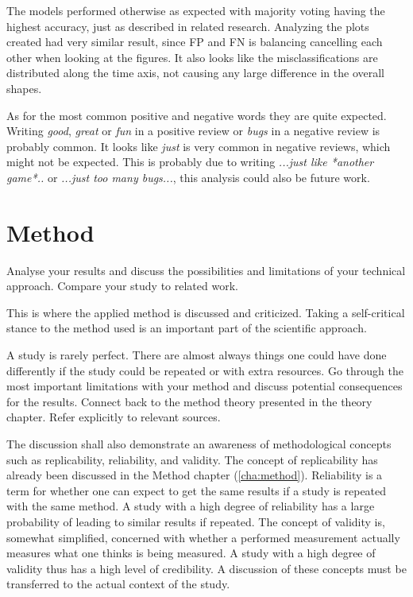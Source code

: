 The models performed otherwise as expected with majority voting having the highest accuracy, just as described in related research. 
Analyzing the plots created had very similar result, since FP and FN is balancing cancelling each other when looking at the figures. 
It also looks like the misclassifications are distributed along the time axis, not causing any large difference in the overall shapes. 


As for the most common positive and negative words they are quite expected. 
Writing \emph{good}, \emph{great} or \emph{fun} in a positive review or \emph{bugs} in a negative review is probably common. 
It looks like \emph{just} is very common in negative reviews, which might not be expected. 
This is probably due to writing \emph{...just like *another game*..} or \emph{...just too many bugs...}, this analysis could also be future work.


\section{Method}
\label{sec:discussion-method}

Analyse your results and discuss the possibilities and limitations of
your technical approach. Compare your study to related work.

This is where the applied method is discussed and criticized.
Taking a self-critical stance to the method used is an
important part of the scientific approach.

A study is rarely perfect. There are almost always things one
could have done differently if the study could be repeated or
with extra resources. Go through the most important
limitations with your method and discuss potential
consequences for the results. Connect back to the method
theory presented in the theory chapter. Refer explicitly to
relevant sources.

The discussion shall also demonstrate an awareness of methodological
concepts such as replicability, reliability, and validity. The concept
of replicability has already been discussed in the Method chapter
(\ref{cha:method}). Reliability is a term for whether one can expect
to get the same results if a study is repeated with the same method. A
study with a high degree of reliability has a large probability of
leading to similar results if repeated. The concept of validity is,
somewhat simplified, concerned with whether a performed measurement
actually measures what one thinks is being measured. A study with a
high degree of validity thus has a high level of credibility. A
discussion of these concepts must be transferred to the actual context
of the study.

